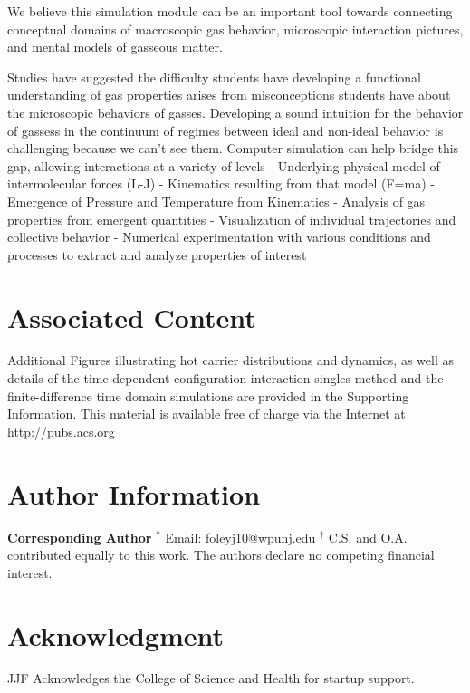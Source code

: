 \documentclass[journal=jpclcd,manuscript=article]{achemso}
\begin{document}
We believe this simulation module can be an important tool towards connecting conceptual domains of macroscopic gas behavior,
microscopic interaction pictures, and mental models of gasseous matter.

Studies have suggested the difficulty students have developing a functional understanding of gas properties
arises from misconceptions students have about the microscopic behaviors of gasses.
Developing a sound intuition for the behavior of gassess in the continuum of regimes between ideal and non-ideal
behavior is challenging because we can't see them.
Computer simulation can help bridge this gap, allowing interactions at a variety of levels
- Underlying physical model of intermolecular forces (L-J)
- Kinematics resulting from that model (F=ma)
- Emergence of Pressure and Temperature from Kinematics
- Analysis of gas properties from emergent quantities
- Visualization of individual trajectories and collective behavior
- Numerical experimentation with various conditions and processes to extract and analyze properties of interest




\section{Associated Content}
Additional Figures illustrating hot carrier distributions and dynamics, as well as details of the time-dependent
configuration interaction singles method and the finite-difference time domain simulations are provided in the Supporting 
Information.  This material is available free of charge via the Internet at http://pubs.acs.org

\section{Author Information}
{\bf Corresponding Author}
$^*$ Email: foleyj10@wpunj.edu
\newline
$^{\dagger}$  C.S. and O.A. contributed equally to this work.
\newline
The authors declare no competing financial interest.

\section{Acknowledgment}
JJF Acknowledges the College of Science and Health for startup support.


 
\end{document}
